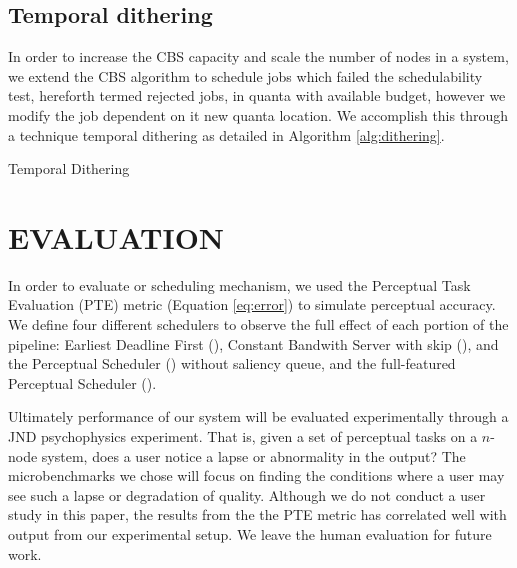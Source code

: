 \documentclass{sigchi}
\newcommand*{\schedule}[1]{{\textbf{\small{\fontfamily{cmss}\selectfont{#1}}}}}
\begin{document}
  \subsection{Temporal dithering}
  In order to increase the CBS capacity and scale the number of nodes in a system, we extend the CBS algorithm to schedule jobs which failed the schedulability test, hereforth termed rejected jobs, in quanta with available budget, however we modify the job dependent on it new quanta location. We accomplish this through a technique temporal dithering as detailed in Algorithm \ref{alg:dithering}. 

  

\begin{algorithm}


 \caption{Temporal Dithering}
 \label{alg:dithering}
\end{algorithm}





 

  \section{EVALUATION}
  In order to evaluate or scheduling mechanism, we used the Perceptual Task Evaluation (PTE) metric (Equation \ref{eq:error}) to simulate perceptual accuracy. We define four different schedulers to observe the full effect of each portion of the pipeline: Earliest Deadline First (\schedule{EDF}), Constant Bandwith Server with skip (\schedule{CBS-S}), and the Perceptual Scheduler (\schedule{PS-A}) without saliency queue, and the full-featured Perceptual Scheduler (\schedule{PS-T}). 

  Ultimately performance of our system will be evaluated experimentally through a JND psychophysics experiment. That is, given a set of perceptual tasks on a $n$-node system, does a user notice a lapse or abnormality in the output? The microbenchmarks we chose will focus on finding the conditions where a user may see such a lapse or degradation of quality. Although we do not conduct a user study in this paper, the results from the the PTE metric has correlated well with output from our experimental setup. We leave the human evaluation for future work. 
\end{document}
